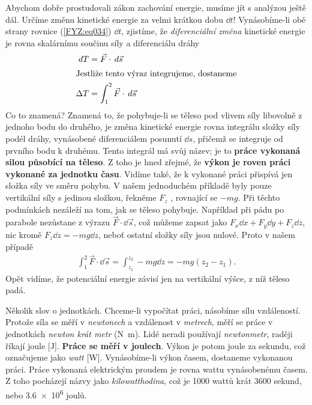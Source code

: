 {    Abychom dobře prostudovali zákon zachování energie, musíme jít s analýzou ještě dál. Určíme 
    změnu kinetické energie za velmi krátkou dobu \(\dd{t}\)! Vynásobíme-li obě strany rovnice 
    (\ref{FYZ:eq034}) \(\dd{t}\), zjistíme, že \emph{diferenciální změna} kinetické energie je 
    rovna skalárnímu součinu síly a diferenciálu dráhy
    \begin{align}
      \hspace{2pt}dT    &= \vec{F}\cdot\hspace{2pt}d\vec{s}              \label{FYZ:eq035} \\
      \shortintertext{Jestliže tento výraz integrujeme, dostaneme}
      \Delta T  &= \int_{1}^{2}\vec{F}\cdot\hspace{2pt}d\vec{s}  \label{FYZ:eq036}
    \end{align}
    Co to znamená? Znamená to, že pohybuje-li se těleso pod vlivem síly libovolně z jednoho bodu do 
    druhého, je změna kinetické energie rovna integrálu složky síly podél dráhy, vynásobené 
    diferenciálem posunutí \(\dd{s}\), přičemž se integruje od prvního bodu k druhému. Tento 
    integrál má svůj název; je to \textbf{práce vykonaná silou působící na těleso}. Z toho je hned 
    zřejmé, že \textbf{výkon je roven práci vykonané za jednotku času}. Vidíme také, že k vykonané 
    práci přispívá jen složka síly ve směru pohybu. V našem jednoduchém příkladě byly pouze 
    vertikální síly s jedinou složkou, řekněme \(F_z\) , rovnající se \(- mg\). Při těchto 
    podmínkách nezáleží na tom, jak se těleso pohybuje. Například při pádu po parabole nezůstane z 
    výrazu \(\vec{F}\cdot\dd{\vec{s}}\), což můžeme zapsat jako \(F_x\dd{x} + F_y\dd{y} + 
    F_z\dd{z}\), nic kromě \(F_z\dd{z}=-mg\dd{z}\), neboť ostatní složky síly jsou nulové. Proto v 
    našem případě
    \begin{align}
      \int_{1}^{2}\vec{F}\cdot\dd{\vec{s}} = 
      \int_{z_1}^{z_2}-mg\dd{z} = 
      -mg(z_2 - z_1). \label{FYZ:eq037}
    \end{align}
    Opět vidíme, že potenciální energie závisí jen na vertikální výšce, z níž těleso padá.
    
    Několik slov o jednotkách. Chceme-li vypočítat práci, násobíme sílu vzdáleností. Protože síla 
    se měří v \emph{newtonech} a vzdálenost v \emph{metrech}, měří se práce v jednotkách 
    \emph{newton krát metr} (\si{\newton\meter}). Lidé neradi používají \emph{newtonmetr}, raději 
    říkají joule [\si{\joule}]. \textbf{Práce se měří v joulech}. Výkon je potom joule za sekundu, 
    což označujeme jako \emph{watt} [\si{\watt}]. Vynásobíme-li výkon časem, dostaneme vykonanou 
    práci. Práce vykonaná elektrickým proudem je rovna wattu vynásobenému časem. Z toho pocházejí 
    názvy jako \emph{kilowatthodina}, což je \num{1000} wattů krát \num{3600} sekund, nebo 
    \num{3.6e6} joulů.
    
}

